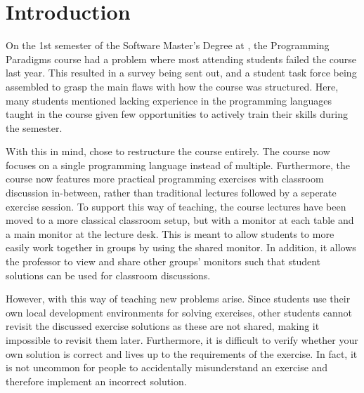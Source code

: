 \chapter{Introduction} \label{chap:introduction}
On the 1st semester of the Software Master’s Degree at \aau{}, the Programming Paradigms course had a problem where most attending students failed the course last year. 
This resulted in a survey being sent out, and a student task force being assembled to grasp the main flaws with how the course was structured. 
Here, many students mentioned lacking experience in the programming languages taught in the course given few opportunities to actively train their skills during the semester. 


With this in mind, \aau{} chose to restructure the course entirely. 
The course now focuses on a single programming language instead of multiple. 
Furthermore, the course now features more practical programming exercises with classroom discussion in-between, rather than traditional lectures followed by a seperate exercise session.
To support this way of teaching, the course lectures have been moved to a more classical classroom setup, but with a monitor at each table and a main monitor at the lecture desk. 
This is meant to allow students to more easily work together in groups by using the shared monitor.
In addition, it allows the professor to view and share other groups' monitors such that student solutions can be used for classroom discussions. 


However, with this way of teaching new problems arise.
Since students use their own local development environments for solving exercises, other students cannot revisit the discussed exercise solutions as these are not shared, making it impossible to revisit them later. 
Furthermore, it is difficult to verify whether your own solution is correct and lives up to the requirements of the exercise. 
In fact, it is not uncommon for people to accidentally misunderstand an exercise and therefore implement an incorrect solution.

